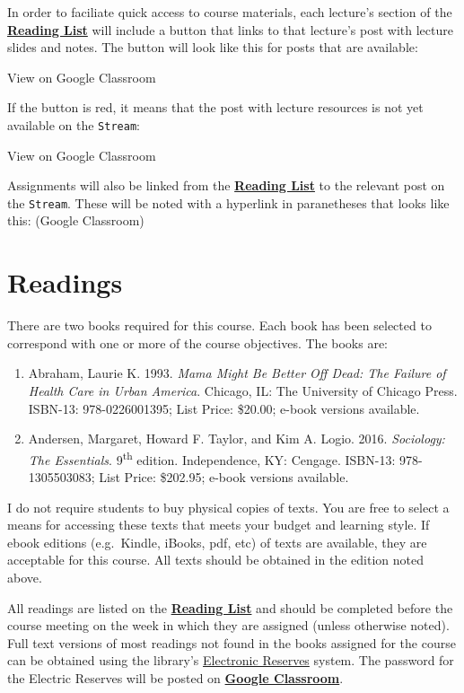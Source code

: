 \documentclass[]{book}
\theoremstyle{definition}
\theoremstyle{definition}
\theoremstyle{definition}
\theoremstyle{remark}
\begin{document}
In order to faciliate quick access to course materials, each lecture's
section of the \href{/lecture-schedule.html}{\textbf{Reading List}} will
include a button that links to that lecture's post with lecture slides
and notes. The button will look like this for posts that are available:

View on Google Classroom

If the button is red, it means that the post with lecture resources is
not yet available on the \texttt{Stream}:

View on Google Classroom

Assignments will also be linked from the
\href{/lecture-schedule.html}{\textbf{Reading List}} to the relevant
post on the \texttt{Stream}. These will be noted with a hyperlink in
paranetheses that looks like this: (Google Classroom)

\hypertarget{readings}{%
\section{Readings}\label{readings}}

There are two books required for this course. Each book has been
selected to correspond with one or more of the course objectives. The
books are:

\begin{enumerate}
\def\labelenumi{\arabic{enumi}.}
\item
  Abraham, Laurie K. 1993. \emph{Mama Might Be Better Off Dead: The
  Failure of Health Care in Urban America}. Chicago, IL: The University
  of Chicago Press. ISBN-13: 978-0226001395; List Price: \$20.00; e-book
  versions available.
\item
  Andersen, Margaret, Howard F. Taylor, and Kim A. Logio. 2016.
  \emph{Sociology: The Essentials}. 9\textsuperscript{th} edition.
  Independence, KY: Cengage. ISBN-13: 978-1305503083; List Price:
  \$202.95; e-book versions available.
\end{enumerate}

I do not require students to buy physical copies of texts. You are free
to select a means for accessing these texts that meets your budget and
learning style. If ebook editions (e.g.~Kindle, iBooks, pdf, etc) of
texts are available, they are acceptable for this course. All texts
should be obtained in the edition noted above.

All readings are listed on the
\href{/lecture-schedule.html}{\textbf{Reading List}} and should be
completed before the course meeting on the week in which they are
assigned (unless otherwise noted). Full text versions of most readings
not found in the books assigned for the course can be obtained using the
library's
\href{http://eres.slu.edu/eres/coursepass.aspx?cid=4443}{Electronic
Reserves} system. The password for the Electric Reserves will be posted
on \textbf{\href{https://classroom.google.com}{Google Classroom}}.
\end{document}
